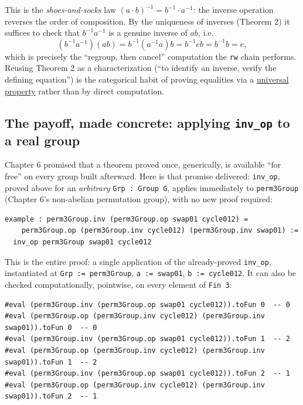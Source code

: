 \begin{mathreading}

This is the \emph{shoes-and-socks} law \((a\cdot
b)^{-1} = b^{-1}\cdot a^{-1}\): the inverse operation reverses the order of composition. By the uniqueness of inverses (Theorem 2) it suffices to check that \(b^{-1}a^{-1}\) is a genuine inverse of \(ab\), i.e. \[
(b^{-1}a^{-1})(ab) = b^{-1}(a^{-1}a)b = b^{-1}eb = b^{-1}b = e,
\] which is precisely the ``regroup, then cancel'' computation the \texttt{rw} chain performs. Reusing Theorem 2 as a characterization (``to identify an inverse, verify the defining equation'') is the categorical habit of proving equalities via a \hyperref[sec:01-basics:04-terminology:1]{universal property} rather than by direct computation.

\end{mathreading}

\subsection{\texorpdfstring{The payoff, made concrete: applying \texttt{inv\_op} to a real group}{The payoff, made concrete: applying inv\_op to a real group}}\label{sec:07-group-theorems:04-theorem-3:2}

Chapter 6 promised that a theorem proved once, generically, is available ``for free'' on every group built afterward. Here is that promise delivered: \texttt{inv\_\allowbreak{}op}, proved above for an \emph{arbitrary} \texttt{Grp : Group G}, applies immediately to \texttt{perm3Group} (Chapter 6's non-abelian permutation group), with no new proof required:

\begin{lstlisting}
example : perm3Group.inv (perm3Group.op swap01 cycle012) =
    perm3Group.op (perm3Group.inv cycle012) (perm3Group.inv swap01) :=
  inv_op perm3Group swap01 cycle012
\end{lstlisting}

This is the entire proof: a single application of the already-proved \texttt{inv\_\allowbreak{}op}, instantiated at \texttt{Grp := perm3Group}, \texttt{a := swap01}, \texttt{b := cycle012}. It can also be checked computationally, pointwise, on every element of \texttt{Fin 3}:

\begin{lstlisting}
#eval (perm3Group.inv (perm3Group.op swap01 cycle012)).toFun 0  -- 0
#eval (perm3Group.op (perm3Group.inv cycle012) (perm3Group.inv swap01)).toFun 0  -- 0
#eval (perm3Group.inv (perm3Group.op swap01 cycle012)).toFun 1  -- 2
#eval (perm3Group.op (perm3Group.inv cycle012) (perm3Group.inv swap01)).toFun 1  -- 2
#eval (perm3Group.inv (perm3Group.op swap01 cycle012)).toFun 2  -- 1
#eval (perm3Group.op (perm3Group.inv cycle012) (perm3Group.inv swap01)).toFun 2  -- 1
\end{lstlisting}

